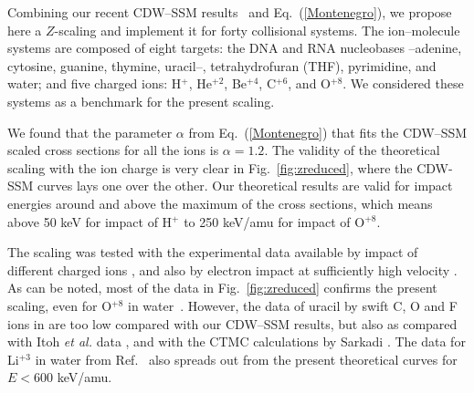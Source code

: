 \documentclass[10pt,showpacs,showkeys,twocolumn]{revtex4}
\begin{document}
 
Combining our recent CDW--SSM results~\cite{MendezJPB20} and Eq.~(\ref{Montenegro}), we propose here a $Z$-scaling and implement it for forty collisional systems. The ion--molecule systems are composed of eight targets: the DNA and RNA nucleobases --adenine, cytosine, guanine, thymine, uracil--, tetrahydrofuran (THF), pyrimidine, and water; and five charged ions: H$^+$, He$^{+2}$, Be$^{+4}$, C$^{+6}$, and O$^{+8}$. We considered these systems as a benchmark for the present scaling. 


We found that the parameter $\alpha$ from Eq.~(\ref{Montenegro}) that fits the CDW--SSM scaled cross sections for all the ions is $\alpha=1.2$. 
The validity of the theoretical scaling with the ion charge is very clear in Fig.~\ref{fig:zreduced}, where the CDW-SSM curves lays one over the other.  Our theoretical results are valid for impact energies around and above the maximum of the cross sections, which means above 50 keV for impact of H$^+$  to 250 keV/amu for impact of O$^{+8}$. 

The scaling was tested with the experimental data available %
by impact of different charged ions \cite{itoh2013,iriki2011,wolff2014,wang2016,tribedi2019,agnihotri2012,agnihotri2013,Luna2007,Rudd86,Rudd85,Luna_Li_water,DalCappello2009,Tribedi_O_water},
and also by electron impact at sufficiently high velocity \cite{rahman2016,bug2017,wolf2019,fuss2009}. As can be noted, most of the data in Fig.~\ref{fig:zreduced} confirms the present scaling, even for O$^{+8}$ in water~\cite{Tribedi_O_water}. However, the data of uracil by swift C, O and F ions in \cite{agnihotri2012,agnihotri2013} are too low compared with our CDW--SSM results, but also as compared with Itoh \textit{et al.} data \cite{itoh2013}, and with the CTMC calculations by Sarkadi \cite{sarkadi2016}.
The data for Li$^{+3}$ in water from Ref.~\cite{Luna_Li_water} also spreads out from the present theoretical curves for $E<600$ keV/amu.






\end{document}
